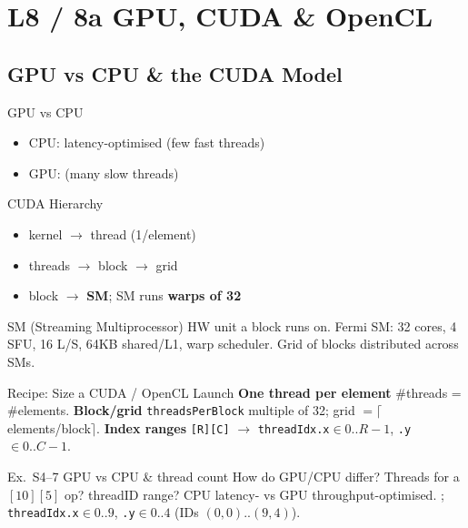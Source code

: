 \section{L8 / 8a GPU, CUDA \& OpenCL}

\subsection{GPU vs CPU \& the CUDA Model}


\begin{concept}{GPU vs CPU}
    \begin{itemize}
        \item CPU: latency-optimised (few fast threads)
        \item GPU:  (many slow threads)
    \end{itemize}
\end{concept}

\begin{definition}{CUDA Hierarchy}
    \begin{itemize}
        \item kernel $\to$ thread (1/element)
        \item threads $\to$ block $\to$ grid
        \item block $\to$ \textbf{SM}; SM runs \textbf{warps of 32}
    \end{itemize}
\end{definition}

\multend

\begin{definition}{SM (Streaming Multiprocessor)}
    HW unit a block runs on. Fermi SM: 32 cores, 4 SFU, 16 L/S, 64KB shared/L1, warp scheduler. Grid of blocks distributed across SMs.
\end{definition}

\begin{KR}{Recipe: Size a CUDA / OpenCL Launch}
    \textbf{One thread per element} \#threads = \#elements.
    \textbf{Block/grid} \texttt{threadsPerBlock} multiple of 32; grid $=\lceil$elements/block$\rceil$.
    \textbf{Index ranges} \texttt{[R][C]} $\to$ \texttt{threadIdx.x}$\in0..R{-}1$, \texttt{.y}$\in0..C{-}1$.
\end{KR}

\begin{example2}{Ex.\ S4--7 GPU vs CPU \& thread count}
    How do GPU/CPU differ? Threads for a $[10][5]$ op? threadID range?
    \tcblower
    CPU latency- vs GPU throughput-optimised. ; \texttt{threadIdx.x}$\in0..9$, \texttt{.y}$\in0..4$ (IDs $(0,0)..(9,4)$).
\end{example2}


